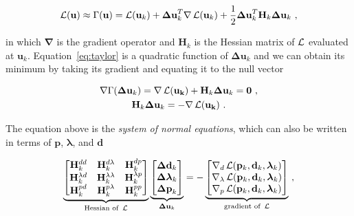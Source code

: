 \begin{equation}
  \operatorname{\mathcal{L}}(\mathbf{u}) \approx
  \Gamma(\mathbf{u}) =
  \operatorname{\mathcal{L}}(\mathbf{u}_k)
    + \mathbf{\Delta u}_k^T \mathbf{\nabla}\operatorname{\mathcal{L}}(\mathbf{u}_k)
    + \dfrac{1}{2}\mathbf{\Delta u}_k^T\mathbf{H}_k\mathbf{\Delta u}_k
  \ ,
  \label{eq:taylor}
\end{equation}

\noindent
in which $\mathbf{\nabla}$ is the gradient operator and $\mathbf{H}_k$ is the
Hessian matrix of $\operatorname{\mathcal{L}}$ evaluated at $\mathbf{u}_k$.
Equation~\ref{eq:taylor} is a quadratic function of $\mathbf{\Delta u}_k$ and
we can obtain its minimum by taking its gradient and equating it to the null
vector

\begin{equation}
  \begin{gathered}
    \mathbf{\nabla}\Gamma(\mathbf{\Delta u}_k) =
      \mathbf{\nabla}\operatorname{\mathcal{L}}(\mathbf{u_k})
      + \mathbf{H}_k\mathbf{\Delta u}_k
      = \mathbf{0}
    \ ,
    \\
    \mathbf{H}_k\mathbf{\Delta u}_k = -\mathbf{\nabla}\operatorname{\mathcal{L}}(\mathbf{u_k})
    \ .
  \end{gathered}
\end{equation}

\noindent
The equation above is the \textit{system of normal equations}, which can also
be written in terms of $\mathbf{p}$, $\boldsymbol{\lambda}$, and $\mathbf{d}$

\begin{equation}
  \underbrace{
    \begin{bmatrix}
      \mathbf{H}^{dd}_k & \mathbf{H}^{d\lambda}_k & \mathbf{H}^{dp}_k \\
      \mathbf{H}^{\lambda d}_k & \mathbf{H}^{\lambda\lambda}_k & \mathbf{H}^{\lambda p}_k \\
      \mathbf{H}^{pd}_k & \mathbf{H}^{p\lambda}_k & \mathbf{H}^{pp}_k
    \end{bmatrix}
  }_{\text{Hessian of }\operatorname{\mathcal{L}}}
  \underbrace{
    \begin{bmatrix}
      \mathbf{\Delta d}_k \\
      \boldsymbol{\Delta\lambda}_k \\
      \mathbf{\Delta p}_k
    \end{bmatrix}
  }_{\mathbf{\Delta u}_k}
  = -
  \underbrace{
    \begin{bmatrix}
      \mathbf{\nabla}_d\operatorname{\mathcal{L}}(\mathbf{p}_k,\mathbf{d}_k,\boldsymbol{\lambda}_k) \\
      \mathbf{\nabla}_\lambda\operatorname{\mathcal{L}}(\mathbf{p}_k,\mathbf{d}_k,\boldsymbol{\lambda}_k) \\
      \mathbf{\nabla}_p\operatorname{\mathcal{L}}(\mathbf{p}_k,\mathbf{d}_k,\boldsymbol{\lambda}_k)
    \end{bmatrix}
  }_{\text{gradient of }\operatorname{\mathcal{L}}}
  \ ,
\end{equation}

